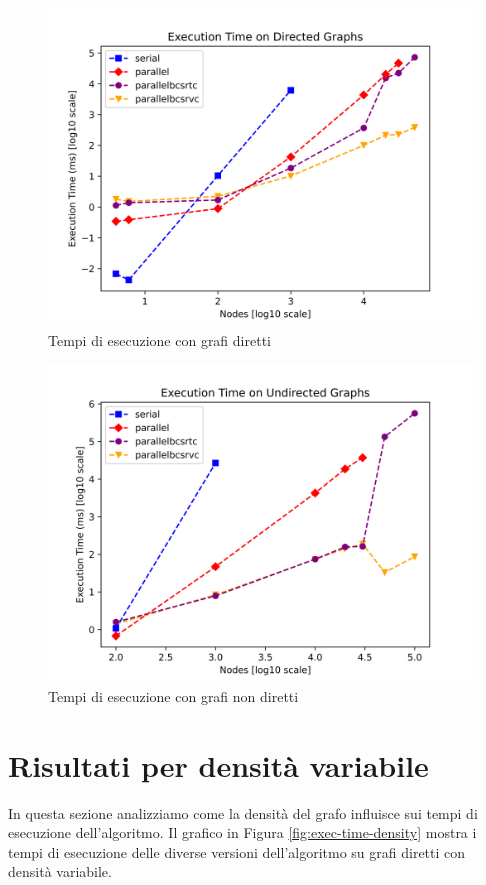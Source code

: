         \begin{figure}
            \centering
            \includegraphics[width=0.7\linewidth]{images/execution_time_directed.png}
            \caption{Tempi di esecuzione con grafi diretti}
            \label{fig:exec-time-dir}
        \end{figure}
    
        \begin{figure}
            \centering
            \includegraphics[width=0.7\linewidth]{images/execution_time_undirected.png}
            \caption{Tempi di esecuzione con grafi non diretti}
            \label{fig:exec-time-undir}
        \end{figure}
    
    
    \section{Risultati per densità variabile}

        In questa sezione analizziamo come la densità del grafo influisce sui tempi di esecuzione dell'algoritmo. Il grafico in Figura \ref{fig:exec-time-density} mostra i tempi di esecuzione delle diverse versioni dell'algoritmo su grafi diretti con densità variabile.

